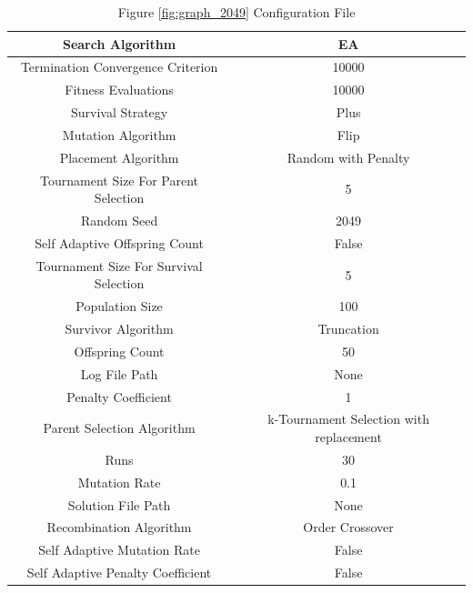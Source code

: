 \documentclass{standalone}
\begin{document}
\begin{table}[!htb]
	\centering
	\caption{Figure \ref{fig:graph_2049} Configuration File}
	\label{tab:graph_2049}
	\begin{tabular}{| c | c |}
		\hline
		Search Algorithm		& EA		 \\
		\hline
		Termination Convergence Criterion		& 10000		 \\
		\hline
		Fitness Evaluations		& 10000		 \\
		\hline
		Survival Strategy		& Plus		 \\
		\hline
		Mutation Algorithm		& Flip		 \\
		\hline
		Placement Algorithm		& Random with Penalty		 \\
		\hline
		Tournament Size For Parent Selection		& 5		 \\
		\hline
		Random Seed		& 2049		 \\
		\hline
		Self Adaptive Offspring Count		& False		 \\
		\hline
		Tournament Size For Survival Selection		& 5		 \\
		\hline
		Population Size		& 100		 \\
		\hline
		Survivor Algorithm		& Truncation		 \\
		\hline
		Offspring Count		& 50		 \\
		\hline
		Log File Path		& None		 \\
		\hline
		Penalty Coefficient		& 1		 \\
		\hline
		Parent Selection Algorithm		& k-Tournament Selection with replacement		 \\
		\hline
		Runs		& 30		 \\
		\hline
		Mutation Rate		& 0.1		 \\
		\hline
		Solution File Path		& None		 \\
		\hline
		Recombination Algorithm		& Order Crossover		 \\
		\hline
		Self Adaptive Mutation Rate		& False		 \\
		\hline
		Self Adaptive Penalty Coefficient		& False		 \\
		\hline
	\end{tabular}
\end{table}
\end{document}

